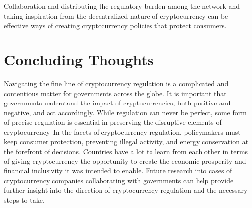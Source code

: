 \documentclass{article}
\begin{document}
\noindent \newline Collaboration and distributing the regulatory burden among the network and taking inspiration from the decentralized nature of cryptocurrency can be effective ways of creating cryptocurrency policies that protect consumers.


\section{Concluding Thoughts}

\noindent Navigating the fine line of cryptocurrency regulation is a complicated and contentious matter for governments across the globe. It is important that governments understand the impact of cryptocurrencies, both positive and negative, and act accordingly. While regulation can never be perfect, some form of precise regulation is essential in preserving the disruptive elements of cryptocurrency. In the facets of cryptocurrency regulation, policymakers must keep consumer protection, preventing illegal activity, and energy conservation at the forefront of decisions. Countries have a lot to learn from each other in terms of giving cryptocurrency the opportunity to create the economic prosperity and financial inclusivity it was intended to enable. Future research into cases of cryptocurrency companies collaborating with governments can help provide further insight into the direction of cryptocurrency regulation and the necessary steps to take.
\end{document}

